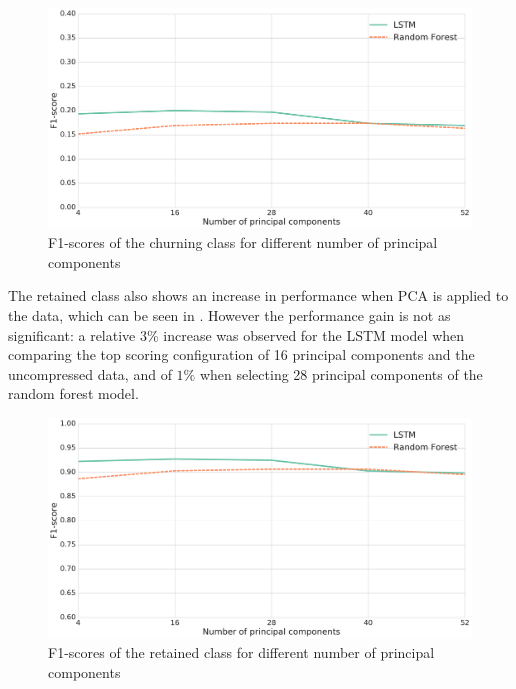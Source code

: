 \documentclass{kththesis}
\begin{document}
\begin{figure}[H]
    \centering
    \includegraphics[width=1.0\textwidth,keepaspectratio]{figures/line_dim_reduction.pdf}
    \caption{F1-scores of the churning class for different number of principal components}
    \label{fig:line_dim_reduction}
\end{figure}

The retained class also shows an increase in performance when PCA is applied to the data, which can be seen in . However the performance gain is not as significant: a relative $3\%$ increase was observed for the LSTM model when comparing the top scoring configuration of 16 principal components and the uncompressed data, and of $1\%$ when selecting 28 principal components of the random forest model.  


\begin{figure}[H]
    \centering
    \includegraphics[width=1.0\textwidth,keepaspectratio]{figures/line_dim_reduction_retained.pdf}
    \caption{F1-scores of the retained class for different number of principal components}
    \label{fig:line_dim_reduction_ret}
\end{figure}
\end{document}
